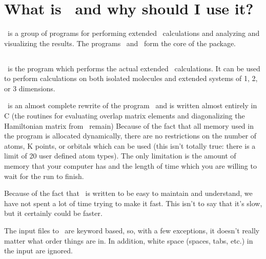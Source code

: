 
\chapter{What is \prog\ and why should I use it?}

\prog\ is a group of programs for performing extended \huek\
calculations \cite{eht1,eht2} and analyzing and visualizing the results. 
The programs \calcprog\ and \viewprog\ form the core of the package.

\section{\calcprog}

\calcprog\ is the program which performs the actual extended
\huek\ calculations.  It can be used to perform calculations on both
isolated molecules and extended systems of 1, 2, or 3 dimensions. 

\calcprog\ is an almost complete rewrite of the program \oldprog\
and is written almost entirely in C (the routines for
evaluating overlap matrix elements and diagonalizing the
Hamiltonian matrix from \oldprog\ remain)
Because of the fact that all memory
used in the program is allocated dynamically, there are no
restrictions on the number of atoms, K points, or orbitals which can
be used (this isn't totally true:  there is a limit of 20 user defined
atom types).  The only limitation is the amount of memory that your
computer has and the length of time which you are willing to wait for
the run to finish.

Because of the fact that \calcprog\ is written to be easy to
maintain and understand, we have not spent a lot of
time trying to make it fast.  This isn't to say that it's slow, but it
certainly could be faster.

The input files to \calcprog\ are keyword based, so, with a few
exceptions, it doesn't really matter what order things are in.  In
addition, white space (spaces, tabs, etc.) in the input are ignored.

